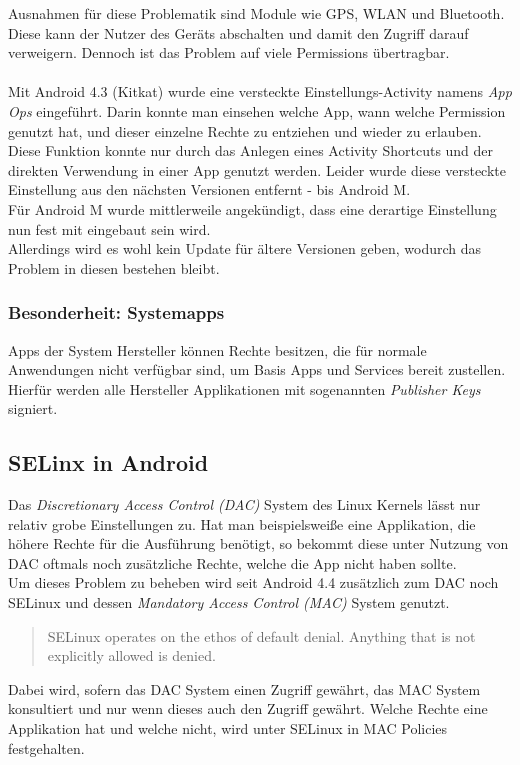 	Ausnahmen für diese Problematik sind Module wie GPS, WLAN und Bluetooth. Diese kann der Nutzer des Geräts abschalten und damit den Zugriff darauf verweigern.
	Dennoch ist das Problem auf viele Permissions übertragbar.\\\\
	Mit Android 4.3 (Kitkat) wurde eine versteckte Einstellungs-Activity namens \textit{App Ops} eingeführt. Darin konnte man einsehen welche App, wann welche Permission genutzt hat, und dieser einzelne Rechte zu entziehen und wieder zu erlauben. Diese Funktion konnte nur durch das Anlegen eines Activity Shortcuts und der direkten Verwendung in einer App genutzt werden. Leider wurde diese versteckte Einstellung aus den nächsten Versionen entfernt - bis Android M. \cite{HiddenActivity} \\
	Für Android M wurde mittlerweile angekündigt, dass eine derartige Einstellung nun fest mit eingebaut sein wird.\cite{AndroidMPermission}\\
	Allerdings wird es wohl kein Update für ältere Versionen geben, wodurch das Problem in diesen bestehen bleibt.
	
	\subsubsection{Besonderheit: Systemapps}
	
	Apps der System Hersteller können Rechte besitzen, die für normale Anwendungen nicht verfügbar sind, um Basis Apps und Services bereit zustellen. Hierfür werden alle Hersteller Applikationen mit sogenannten \textit{Publisher Keys} signiert.
	
	\subsection{SELinx in Android}
	Das \textit{Discretionary Access Control (DAC)} System des Linux Kernels lässt nur relativ grobe Einstellungen zu. Hat man beispielsweiße eine Applikation, die höhere Rechte für die Ausführung benötigt, so bekommt diese unter Nutzung von DAC oftmals noch zusätzliche Rechte, welche die App nicht haben sollte.\\
	Um dieses Problem zu beheben wird seit Android 4.4 zusätzlich zum DAC noch SELinux und dessen \textit{Mandatory Access Control (MAC)} System genutzt.\\	
	\begin{quote}
	SELinux operates on the ethos of default denial. Anything that is not explicitly allowed is denied.\cite{SELinuxAndroid}
	\end{quote}
	Dabei wird, sofern das DAC System einen Zugriff gewährt, das MAC System konsultiert und nur wenn dieses auch den Zugriff gewährt. Welche Rechte eine Applikation hat und welche nicht, wird unter SELinux in MAC Policies festgehalten. 
	
